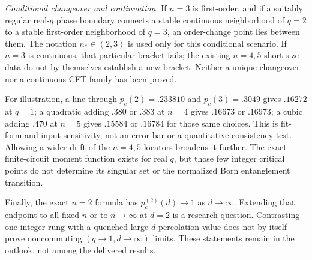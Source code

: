 \emph{Conditional changeover and continuation.} If $n=3$ is first-order, and if a suitably regular real-$q$ phase boundary connects a stable continuous neighborhood of $q=2$ to a stable first-order neighborhood of $q=3$, an order-change point lies between them. The notation $n_*\in(2,3)$ is used only for this conditional scenario. If $n=3$ is continuous, that particular bracket fails; the existing $n=4,5$ short-size data do not by themselves establish a new bracket. Neither a unique changeover nor a continuous CFT family has been proved.

For illustration, a line through $p_c(2)=.233810$ and $p_c(3)=.3049$ gives $.16272$ at $q=1$; a quadratic adding $.380$ or $.383$ at $n=4$ gives $.16673$ or $.16973$; a cubic adding $.470$ at $n=5$ gives $.15584$ or $.16784$ for those same choices. This is fit-form and input sensitivity, not an error bar or a quantitative consistency test. Allowing a wider drift of the $n=4,5$ locators broadens it further. The exact finite-circuit moment function exists for real $q$, but those few integer critical points do not determine its singular set or the normalized Born entanglement transition.

Finally, the exact $n=2$ formula has $p_c^{(2)}(d)\to1$ as $d\to\infty$. Extending that endpoint to all fixed $n$ or to $n\to\infty$ at $d=2$ is a research question. Contrasting one integer rung with a quenched large-$d$ percolation value does not by itself prove noncommuting $(q\to1,d\to\infty)$ limits. These statements remain in the outlook, not among the delivered results.
